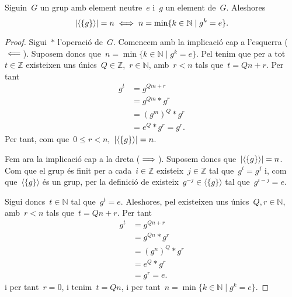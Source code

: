 \documentclass[../../main.tex]{subfiles}
\begin{document}
    \begin{proposition}
        \label{prop:potencia element neutre en un grup}
        Siguin~\(G\) un grup amb element neutre~\(e\) i~\(g\) un element de~\(G\).
        Aleshores
        \[
            \abs{\langle\{g\}\rangle}=n\sii n=\min\{k\in\mathbb{N}\mid g^{k}=e\}.
        \]
        \begin{proof}
            Sigui~\(\ast\) l'operació de~\(G\).
            Comencem amb la implicació cap a l'esquerra (\(\impliedby\)).
            Suposem doncs que~\(n=\min\{k\in\mathbb{N}\mid g^{k}=e\}\).
            Pel  tenim que per a tot~\(t\in\mathbb{Z}\) existeixen uns únics~\(Q\in\mathbb{Z}\),~\(r\in\mathbb{N}\), amb~\(r<n\) tals que~\(t=Qn+r\).
            Per tant
            \begin{align*}
            g^{t}&=g^{Qm+r}\\
            &=g^{Qm}\ast g^{r}\\
            &=(g^{m})^{Q}\ast g^{r}\\
            &=e^{Q}\ast g^{r}=g^{r}.
            \end{align*}
            Per tant, com que~\(0\leq r<n\),~\(\abs{\langle\{g\}\rangle}=n\).

            Fem ara la implicació cap a la dreta (\(\implies\)).
            Suposem doncs que~\(\abs{\langle\{g\}\rangle}=n\).
            Com que el grup és finit per a cada~\(i\in\mathbb{Z}\) existeix~\(j\in\mathbb{Z}\) tal que~\(g^{i}=g^{j}\) i, com que~\(\langle\{g\}\rangle\) és un grup, per la definició de  existeix~\(g^{-j}\in\langle\{g\}\rangle\) tal que~\(g^{i-j}=e\).

            Sigui doncs~\(t\in\mathbb{N}\) tal que~\(g^{t}=e\).
            Aleshores, pel  existeixen uns únics~\(Q,r\in\mathbb{N}\), amb~\(r<n\) tals que~\(t=Qn+r\).
            Per tant
            \begin{align*}
            g^{t}&=g^{Qn+r}\\
            &=g^{Qn}\ast g^{r}\\
            &=(g^{n})^{Q}\ast g^{r}\\
            &=e^{Q}\ast g^{r}\\
            &=g^{r}=e.
            \end{align*}
            i per tant~\(r=0\), i tenim~\(t=Qn\), i per tant~\(n=\min\{k\in\mathbb{N}\mid g^{k}=e\}\).
        \end{proof}
    \end{proposition}
\end{document}
